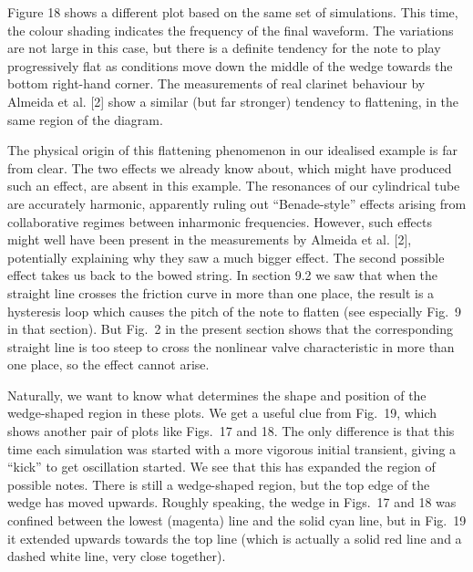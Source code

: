   Figure 18 shows a different plot based on the same set of simulations. This 
  time, the colour shading indicates the frequency of the final waveform. The 
  variations are not large in this case, but there is a definite tendency for 
  the note to play progressively flat as conditions move down the middle of the 
  wedge towards the bottom right-hand corner. The measurements of real clarinet 
  behaviour by Almeida et al. [2] show a similar (but far stronger) tendency to 
  flattening, in the same region of the diagram. 


  The physical origin of this flattening phenomenon in our idealised example is 
  far from clear. The two effects we already know about, which might have 
  produced such an effect, are absent in this example. The resonances of our 
  cylindrical tube are accurately harmonic, apparently ruling out 
  “Benade-style” effects arising from collaborative regimes between inharmonic 
  frequencies. However, such effects might well have been present in the 
  measurements by Almeida et al. [2], potentially explaining why they saw a 
  much bigger effect. The second possible effect takes us back to the bowed 
  string. In section 9.2 we saw that when the straight line crosses the 
  friction curve in more than one place, the result is a hysteresis loop which 
  causes the pitch of the note to flatten (see especially Fig.\ 9 in that 
  section). But Fig.\ 2 in the present section shows that the corresponding 
  straight line is too steep to cross the nonlinear valve characteristic in 
  more than one place, so the effect cannot arise. 

  Naturally, we want to know what determines the shape and position of the 
  wedge-shaped region in these plots. We get a useful clue from Fig.\ 19, which 
  shows another pair of plots like Figs.\ 17 and 18. The only difference is 
  that this time each simulation was started with a more vigorous initial 
  transient, giving a “kick” to get oscillation started. We see that this has 
  expanded the region of possible notes. There is still a wedge-shaped region, 
  but the top edge of the wedge has moved upwards. Roughly speaking, the wedge 
  in Figs.\ 17 and 18 was confined between the lowest (magenta) line and the 
  solid cyan line, but in Fig.\ 19 it extended upwards towards the top line 
  (which is actually a solid red line and a dashed white line, very close 
  together). 

